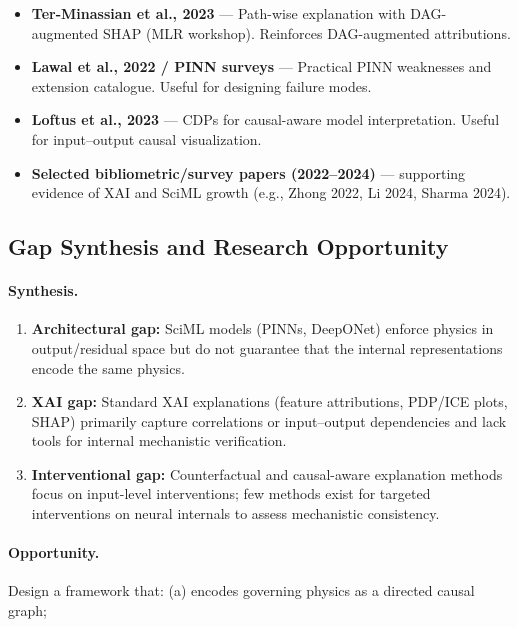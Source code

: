 \documentclass[12pt,singleside,a4paper]{article}
\begin{document}
\begin{itemize}
    \item \textbf{Ter-Minassian et al., 2023} — Path-wise explanation with DAG-augmented SHAP (MLR workshop). Reinforces DAG-augmented attributions. 
    
    \item \textbf{Lawal et al., 2022 / PINN surveys} — Practical PINN weaknesses and extension catalogue. Useful for designing failure modes. 
    
    \item \textbf{Loftus et al., 2023} — CDPs for causal-aware model interpretation. Useful for input–output causal visualization. 
    
    \item \textbf{Selected bibliometric/survey papers (2022--2024)} — supporting evidence of XAI and SciML growth (e.g., Zhong 2022, Li 2024, Sharma 2024). 
    
\end{itemize}

\subsection{Gap Synthesis and Research Opportunity}
\paragraph{Synthesis.}
\begin{enumerate}
    \item \textbf{Architectural gap:} SciML models (PINNs, DeepONet) enforce physics in output/residual space but do not guarantee that the internal representations encode the same physics. 
    
    \item \textbf{XAI gap:} Standard XAI explanations (feature attributions, PDP/ICE plots, SHAP) primarily capture correlations or input–output dependencies and lack tools for internal mechanistic verification. 
    
    \item \textbf{Interventional gap:} Counterfactual and causal-aware explanation methods focus on input-level interventions; few methods exist for targeted interventions on neural internals to assess mechanistic consistency. 
    
\end{enumerate}
\paragraph{Opportunity.}
Design a framework that: (a) encodes governing physics as a directed causal graph; 
\end{document}
